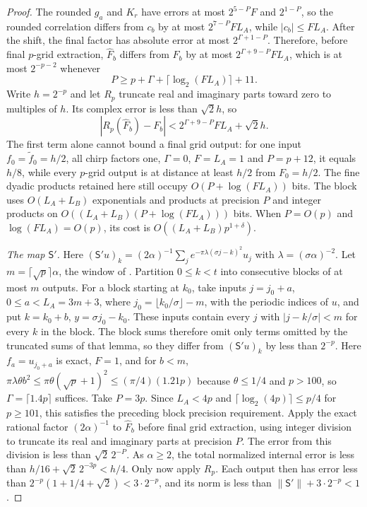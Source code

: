 \begin{proof}
The rounded $g_a$ and $K_r$ have errors at most $2^{5-P}F$ and $2^{1-P}$,
so the rounded correlation differs from $c_b$ by at most $2^{7-P}FL_A$,
while $|c_b|\le FL_A$. After the shift, the final factor has absolute
error at most $2^{\Gamma+1-P}$. Therefore, before final $p$-grid
extraction, $\widehat F_b$ differs from $F_b$ by at most
$2^{\Gamma+9-P}FL_A$, which is at most $2^{-p-2}$ whenever
\[
 P\ge p+\Gamma+\lceil\log_2(FL_A)\rceil+11.
\]
Write $h=2^{-p}$ and let $R_p$ truncate real and imaginary parts toward
zero to multiples of $h$. Its complex error is less than $\sqrt2h$, so
\[
 |R_p(\widehat F_b)-F_b|
 <2^{\Gamma+9-P}FL_A+\sqrt2h.
\]
The first term alone cannot bound a final grid output: for one input
$f_0=\widetilde f_0=h/2$, all chirp factors one, $\Gamma=0$, $F=L_A=1$
and $P=p+12$, it equals $h/8$, while every $p$-grid output is at distance
at least $h/2$ from $F_0=h/2$. The fine dyadic products retained here
still occupy $O(P+\log(FL_A))$ bits.
The block uses $O(L_A+L_B)$ exponentials and products at precision $P$
and integer products on $O((L_A+L_B)(P+\log(FL_A)))$ bits. When
$P=O(p)$ and $\log(FL_A)=O(p)$, its cost is
$O((L_A+L_B)p^{1+\delta})$.

\emph{The map $\mathsf S'$.} Here
$(\mathsf S'u)_k=(2\alpha)^{-1}\sum_je^{-\pi\lambda(\sigma j-k)^2}u_j$
with $\lambda=(\sigma\alpha)^{-2}$. Let $m=\lceil\sqrt p\rceil\alpha$, the
window of \cite[Lemma~4.9]{HarveyHoeven2021}. Partition $0\le k<t$ into
consecutive blocks of at most $m$ outputs. For a block starting at $k_0$,
take inputs $j=j_0+a$, $0\le a<L_A=3m+3$, where $j_0=\lfloor k_0/\sigma\rfloor-m$,
with the periodic indices of $u$, and put $k=k_0+b$, $y=\sigma j_0-k_0$.
These inputs contain every $j$ with $|j-k/\sigma|<m$ for every $k$ in the
block. The block sums therefore omit only terms omitted by the truncated sums
of that lemma, so they differ from $(\mathsf S'u)_k$ by less than $2^{-p}$.
Here $f_a=u_{j_0+a}$ is exact, $F=1$, and for $b<m$,
$\pi\lambda\theta b^2\le\pi\theta(\sqrt p+1)^2\le(\pi/4)(1.21p)$ because
$\theta\le1/4$ and $p>100$, so $\Gamma=\lceil1.4p\rceil$ suffices. Take
$P=3p$. Since $L_A<4p$ and $\lceil\log_2(4p)\rceil\le p/4$ for
$p\ge101$, this satisfies the preceding block precision requirement.
Apply the exact rational factor $(2\alpha)^{-1}$ to $\widehat F_b$
before final grid extraction, using integer division to truncate its
real and imaginary parts at precision $P$. The error from this division
is less than $\sqrt2\,2^{-P}$. As $\alpha\ge2$, the total normalized
internal error is less than
$h/16+\sqrt2\,2^{-3p}<h/4$.
Only now apply $R_p$. Each output then has error less than
$2^{-p}(1+1/4+\sqrt2)<3\cdot2^{-p}$, and its norm is less than
$\|\mathsf S'\|+3\cdot2^{-p}<1$.


\end{proof}
